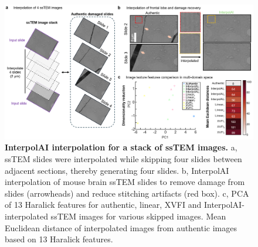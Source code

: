 \begin{refsection}
    \begin{figure}[!htb] 
      \centering
      \includegraphics[width=\linewidth,                   height=0.85\textheight,                   keepaspectratio]{figures/chapter6/fig_4.png}
      \captionsetup{font=small}
      \caption{\textbf{InterpolAI interpolation for a stack of ssTEM images.}
               a, ssTEM slides were interpolated while skipping four slides
               between adjacent sections, thereby generating four slides.
               b, InterpolAI interpolation of mouse brain ssTEM slides to
               remove damage from slides (arrowheads) and reduce stitching
               artifacts (red box).
               c, PCA of 13 Haralick features for authentic, linear, XVFI and
               InterpolAI-interpolated ssTEM images for various skipped images.
               Mean Euclidean distance of interpolated images from authentic
               images based on 13 Haralick features.}
      \label{chapter6_fig4}
    \end{figure}
    
    

\end{refsection}
